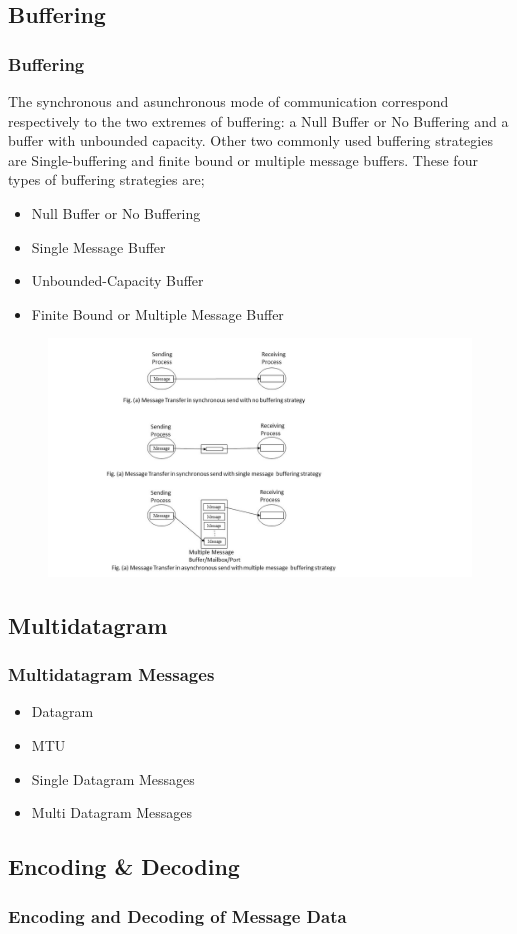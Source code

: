 \documentclass{beamer}
\begin{document}
\subsection{Buffering}
\begin{frame}[allowframebreaks]
	\frametitle{Buffering}
	The synchronous and asunchronous mode of communication correspond respectively to the 
	two extremes of buffering: a Null Buffer or No Buffering and a buffer with unbounded 
	capacity. Other two commonly used buffering strategies are Single-buffering and finite 
	bound or multiple message buffers. These four types of buffering strategies are;
	\begin{itemize}
		\item Null Buffer or No Buffering
		\item Single Message Buffer
		\item Unbounded-Capacity Buffer
		\item Finite Bound or Multiple Message Buffer
	\end{itemize}
	\vspace{1.5cm}		
	\framebreak
	\begin{figure}
		\centering
		\includegraphics[width=15cm]{buffering.jpg}
	\end{figure}
	\vspace{1cm}
\end{frame}



\subsection{Multidatagram}
\begin{frame}
	\frametitle{Multidatagram Messages}
	\begin{itemize}
		\item Datagram
		\item MTU
		\item Single Datagram Messages
		\item Multi Datagram Messages
	\end{itemize}
	\vspace{4cm}
\end{frame}


\subsection{Encoding & Decoding}
\begin{frame}
	\frametitle{Encoding and Decoding of Message Data}
	
\end{frame}
\end{document}
